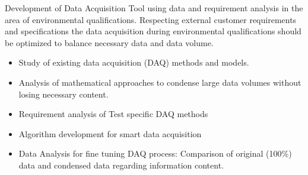 Development of Data Acquisition Tool using data and requirement analysis in the area of environmental qualifications. Respecting external customer requirements and specifications the data acquisition during environmental qualifications should be optimized to balance necessary data and data volume.
\begin{itemize}
    \item Study of existing data acquisition (DAQ) methods and models.
    \item Analysis of mathematical approaches to condense large data volumes without losing necessary content.
    \item Requirement analysis of Test specific DAQ methods
    \item Algorithm development for smart data acquisition
    \item Data Analysis for fine tuning DAQ process: Comparison of original (100\%) data and condensed data regarding information content.
\end{itemize}


